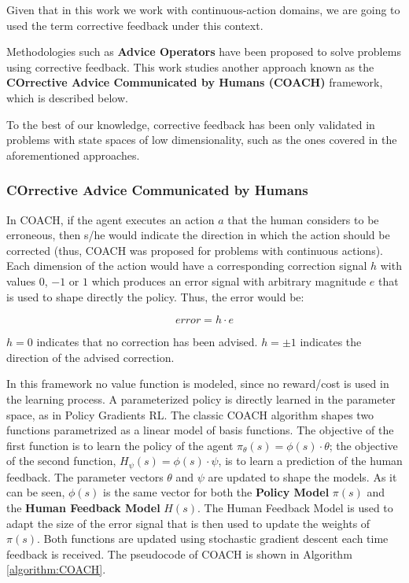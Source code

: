 Given that in this work we work with continuous-action domains, we are going to used the term corrective feedback under this context.  

Methodologies such as \textbf{Advice Operators} \cite{Argall2009, Argall2008} have been proposed to solve problems using corrective feedback. This work studies another approach known as the \textbf{COrrective Advice Communicated by Humans (COACH)} \cite{Celemin2018AnInteractive} framework, which is described below. 

 To the best of our knowledge, corrective feedback has been only validated in problems with state spaces of low dimensionality, such as the ones covered in the aforementioned approaches. 

\subsubsection{COrrective Advice Communicated by Humans}
\label{sss:COACH}
In COACH, if the agent executes an action $a$ that the human considers to be erroneous, then s/he would indicate the direction in which the action should be corrected (thus, COACH was proposed for problems with continuous actions). Each dimension of the action would have a corresponding correction signal $h$ with values $0$, $-1$ or $1$ which produces an error signal with arbitrary magnitude $e$ that is used to shape directly the policy. Thus, the error would be: 

\begin{equation}\label{eq:error}
    error=h \cdot e
\end{equation}

$h=0$ indicates that no correction has been advised. $h=\pm 1$ indicates the direction of the advised correction.

In this framework no value function is modeled, since no reward/cost is used in the learning process. A parameterized policy is directly learned in the parameter space, as in Policy Gradients RL. 
The classic COACH algorithm shapes two functions parametrized as a linear model of basis functions. The objective of the first function is to learn the policy of the agent $\pi_{\theta}(s)=\phi(s) \cdot \theta$; the objective of the second function, $H_{\psi}(s)=\phi(s) \cdot \psi$, is to learn a prediction of the human feedback. The parameter vectors $\theta$ and $\psi$ are updated to shape the models. As it can be seen, $\phi(s)$ is the same vector for both the \textbf{Policy Model} $\pi(s)$ and the \textbf{Human Feedback Model}  $H(s)$. The Human Feedback Model is used to adapt the size of the error signal that is then used to update the weights of $\pi(s)$. Both functions are updated using stochastic gradient descent each time feedback is received. The pseudocode of COACH is shown in Algorithm \ref{algorithm:COACH}.

